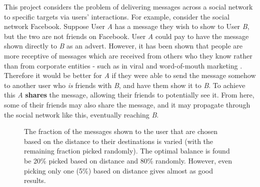 \documentclass[bsc,frontabs,twoside,singlespacing,parskip,deptreport]{infthesis}     %
\begin{document}
This project considers the problem of delivering messages across a social network to specific targets via users' interactions. For example, consider the social network Facebook. Suppose User \textit{A} has a message they wish to show to User \textit{B}, but the two are not friends on Facebook. User \textit{A} could pay to have the message shown directly to \textit{B} as an advert. However, it has been shown that people are more receptive of messages which are received from others who they know rather than from corporate entities - such as in viral and word-of-mouth marketing \cite{viralmarketing, wordofmouth}. Therefore it would be better for \textit{A} if they were able to send the message somehow to another user who \textit{is} friends with \textit{B}, and have them show it to \textit{B}. To achieve this \textit{A} \textbf{shares} the message, allowing their friends to potentially see it. From here, some of their friends may also share the message, and it may propagate through the social network like this, eventually reaching \textit{B}.

\begin{figure}
\centering
{}
\caption{The fraction of the messages shown to the user that are chosen based on the distance to their destinations is varied (with the remaining fraction picked randomly). The optimal balance is found be 20\% picked based on distance and 80\% randomly. However, even picking only one (5\%) based on distance gives almost as good results.}
\label{fig:distance_priority_fraction_intro}
\end{figure}
\end{document}
